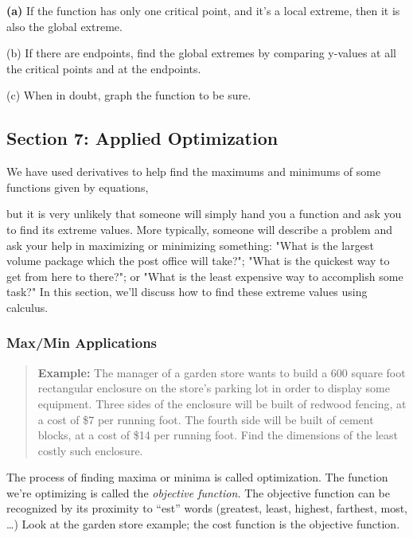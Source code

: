 \textbf{(a)} If the function has only one critical point, and it's a
local extreme, then it is also the global extreme.

(b) If there are endpoints, find the global extremes by comparing
y-values at all the critical points and at the endpoints.

(c) When in doubt, graph the function to be sure.

\hypertarget{section-7-applied-optimization}{\subsection{Section 7:
Applied Optimization}\label{section-7-applied-optimization}}

We have used derivatives to help find the maximums and minimums of some
functions given by equations,

but it is very unlikely that someone will simply hand you a function and
ask you to find its extreme values. More typically, someone will
describe a problem and ask your help in maximizing or minimizing
something: "What is the largest volume package which the post office
will take?"; "What is the quickest way to get from here to there?"; or
"What is the least expensive way to accomplish some task?" In this
section, we'll discuss how to find these extreme values using calculus.

\subsubsection{Max/Min Applications}\label{maxmin-applications}

\begin{quote}
\textbf{Example:} The manager of a garden store wants to build a 600
square foot rectangular enclosure on the store's parking lot in order to
display some equipment. Three sides of the enclosure will be built of
redwood fencing, at a cost of \$7 per running foot. The fourth side will
be built of cement blocks, at a cost of \$14 per running foot. Find the
dimensions of the least costly such enclosure.
\end{quote}

The process of finding maxima or minima is called optimization. The
function we're optimizing is called the \emph{objective function.} The
objective function can be recognized by its proximity to ``est'' words
(greatest, least, highest, farthest, most, \ldots{}) Look at the garden
store example; the cost function is the objective function.

